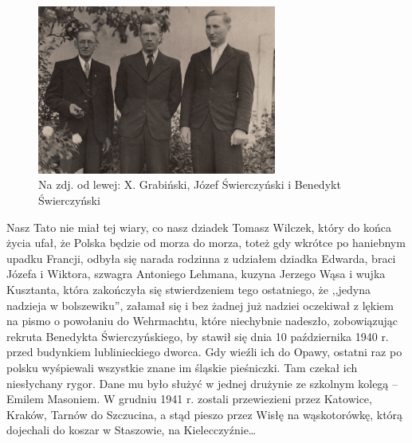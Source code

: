 \begin{figure}[!h]
\begin{center}
\includegraphics[width=0.7\textwidth]{photo/benedykt_swierczynski_z_wujkiem_kusztantem.jpg}
\caption[X. Grabiński, Józef Świerczyński i Benedykt Świerczyński]{Na zdj. od lewej: X. Grabiński, Józef Świerczyński i Benedykt Świerczyński}
\end{center}
\end{figure}

Nasz Tato nie miał tej wiary, co nasz dziadek Tomasz Wilczek, który do końca życia ufał, że Polska będzie od morza do morza, toteż gdy wkrótce po haniebnym upadku Francji, odbyła się narada rodzinna z udziałem dziadka Edwarda, braci Józefa i Wiktora, szwagra Antoniego Lehmana, kuzyna Jerzego Wąsa i wujka Kusztanta, która zakończyła się stwierdzeniem tego ostatniego, że ,,jedyna nadzieja w bolszewiku'', załamał się i bez żadnej już nadziei oczekiwał z lękiem na pismo o powołaniu do Wehrmachtu, które niechybnie nadeszło, zobowiązując rekruta Benedykta Świerczyńskiego, by stawił się dnia 10 października 1940 r. przed budynkiem lublinieckiego dworca. Gdy wieźli ich do Opawy, ostatni raz po polsku wyśpiewali wszystkie znane im śląskie pieśniczki. Tam czekał ich niesłychany rygor. Dane mu było służyć w jednej drużynie ze szkolnym kolegą -- Emilem Masoniem. W grudniu 1941 r. zostali przewiezieni przez Katowice, Kraków, Tarnów do Szczucina, a stąd pieszo przez Wisłę na wąskotorówkę, którą dojechali do koszar w Staszowie, na Kielecczyźnie\ldots

